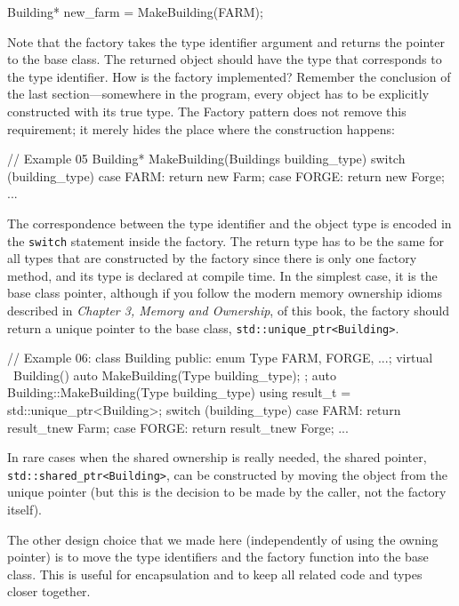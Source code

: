 \begin{code}
Building* new_farm = MakeBuilding(FARM);
\end{code}

Note that the factory takes the type identifier argument and returns the pointer to the base class. The returned object should have the type that corresponds to the type identifier. How is the factory implemented? Remember the conclusion of the last section---somewhere in the program, every object has to be explicitly constructed with its true type. The Factory pattern does not remove this requirement; it merely hides the place where the construction happens:

\begin{code}
// Example 05
Building* MakeBuilding(Buildings building_type) {
  switch (building_type) {
    case FARM: return new Farm;
    case FORGE: return new Forge;
    ...
  }
}
\end{code}

The correspondence between the type identifier and the object type is encoded in the \texttt{switch} statement inside the factory. The return type has to be the same for all types that are constructed by the factory since there is only one factory method, and its type is declared at compile time. In the simplest case, it is the base class pointer, although if you follow the modern memory ownership idioms described in \emph{Chapter 3, Memory and Ownership}, of this book, the factory should return a unique pointer to the base class, \texttt{std::unique\_ptr\textless{}Building\textgreater{}}.

\begin{code}
// Example 06:
class Building {
  public:
  enum Type {FARM, FORGE, ...};
  virtual ~Building() {}
  auto MakeBuilding(Type building_type);
};
auto Building::MakeBuilding(Type building_type) {
  using result_t = std::unique_ptr<Building>;
  switch (building_type) {
    case FARM: return result_t{new Farm};
    case FORGE: return result_t{new Forge};
    ...
  }
}
\end{code}

In rare cases when the shared ownership is really needed, the shared pointer, \texttt{std::shared\_ptr\textless{}Building\textgreater{}}, can be constructed by moving the object from the unique pointer (but this is the decision to be made by the caller, not the factory itself).

The other design choice that we made here (independently of using the owning pointer) is to move the type identifiers and the factory function into the base class. This is useful for encapsulation and to keep all related code and types closer together.

